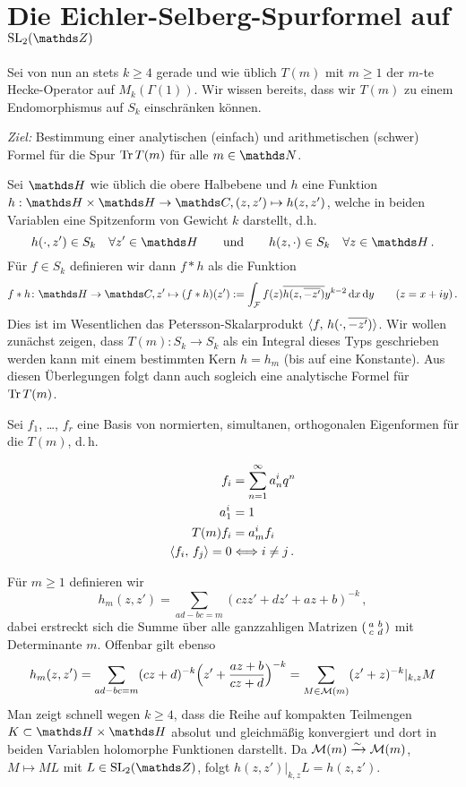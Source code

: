 \chapter{Die Eichler-Selberg-Spurformel auf \texorpdfstring{$\SL_2(\ZZ)$}{SL_2(Z)}}

Sei von nun an stets $k \geq 4$ gerade und wie üblich $T(m)$ mit $m \geq 1$ der $m$-te Hecke-Operator auf $M_k (\Gamma(1))$. Wir wissen bereits, dass wir $T(m)$ zu einem Endomorphismus auf $S_k$ einschränken können.

\emph{Ziel:} Bestimmung einer analytischen (einfach) und arithmetischen (schwer) Formel für die Spur $\operatorname{Tr} T(m)$ für alle $m \in \NN$.

Sei $\HH$ wie üblich die obere Halbebene und $h$ eine Funktion $h: \HH \times \HH \to \CC, (z, z') \mapsto h(z, z')$, welche in beiden Variablen eine Spitzenform von Gewicht $k$ darstellt, d.h. 
\[
	h(\cdot, z') \in S_k \quad \forall z' \in \HH \qquad \text{und} \qquad h(z, \cdot) \in S_k \quad \forall z \in \HH
	\,.
\]
Für $f \in S_k$ definieren wir dann $f \ast h$ als die Funktion
\begin{equation}\label{eq:faltungskern}
	f \ast h \colon \HH \to \CC, z' \mapsto (f \ast h)(z') := \int_{\mathcal F} f(z) \conj{ h(z, \conj{-z'})} y^{k-2} \opd x \opd y \qquad (z = x + iy)
	\,.
\end{equation}
Dies ist im Wesentlichen das Petersson-Skalarprodukt $\scalarprd f{h(\cdot, \conj{-z'})}$. Wir wollen zunächst zeigen, dass $T(m) \colon S_k \to S_k$ als ein Integral dieses Typs geschrieben werden kann mit einem bestimmten Kern $h = h_m$ (bis auf eine Konstante). Aus diesen Überlegungen folgt dann auch sogleich eine analytische Formel für $\operatorname{Tr} T(m)$.

Sei $f_1$, \ldots, $f_r$ eine Basis von normierten, simultanen, orthogonalen Eigenformen für die $T(m)$, d.\,h.

\begin{align*}
f_i &= \sum_{n=1}^\infty a_n^i q^n \\
a_1^i &= 1 \\
T(m)f_i &= a_m^if_i \\
\scalarprd {f_i}{f_j} = 0 &\Rla i \not= j
\,.
\end{align*}


Für $m \geq 1$ definieren wir
\[
h_m(z, z') = \sum_{ad-bc=m} (czz' + dz' + az + b)^{-k}
\,,
\]
dabei erstreckt sich die Summe über alle ganzzahligen Matrizen $\abcd$ mit Determinante $m$.
Offenbar gilt ebenso
\[
h_m(z,z') = \sum_{ad-bc=m} (cz+d)^{-k} \Bigl(z' + \frac{az+b}{cz+d}\Bigr)^{-k}
= \sum_{M \in \mathcal{M}(m)} (z'+z)^{-k}|_{k,z} M
\]
Man zeigt schnell wegen $k \geq 4$, dass die Reihe auf kompakten Teilmengen $K \subset \HH \times \HH$ absolut und gleichmäßig konvergiert und dort in beiden Variablen holomorphe Funktionen darstellt.
Da $\mathcal{M}(m) \xrightarrow{\sim} \mathcal{M}(m)$, $M \mapsto ML$ mit $L \in \SL_2(\ZZ)$,
folgt $h(z,z')|_{k,z} L = h(z, z')$.

